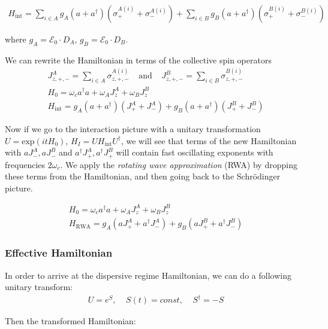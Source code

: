 \documentclass{article}
\numberwithin{equation}{section}
\begin{document}
\begin{gather}
    H_\text{int} = \sum_{i \in A} g_A (a + a^\dagger) (\sigma_{+}^{A(i)} + \sigma_{-}^{A(i)}) + \sum_{i \in B} g_B (a + a^\dagger) (\sigma_{+}^{B(i)} + \sigma_{-}^{B(i)}) 
\end{gather}

where $g_A = \mathcal{E}_0 \cdot D_A$, $g_B = \mathcal{E}_0 \cdot D_B$.

\vspace{1em}
\noindent We can rewrite the Hamiltonian in terms of the collective spin operators 
\begin{gather}
    J_{z,+,-}^A = \sum_{i \in A} \sigma_{z,+,-}^{A(i)}~~~~~ \text{and} ~~~~~ J_{z,+,-}^B = \sum_{i \in B} \sigma_{z,+,-}^{B(i)} \\
    H_0 = \omega_c a^\dagger a + \omega_A J_{z}^A + \omega_B J_{z}^B \\
    H_\text{int} = g_A (a + a^\dagger) (J_{+}^A + J_{-}^A) +  g_B (a + a^\dagger) (J_{+}^B + J_{-}^B)
\end{gather}

\noindent Now if we go to the interaction picture with a unitary transformation $U = \text{exp}(i t H_0)$, $H_I = U H_\text{int} U^\dagger$, we will see that terms of the new Hamiltonian with $a J_{-}^A, a J_{-}^B$ and $a^\dagger J_{+}^A, a^\dagger J_{+}^B$ will contain fast oscillating exponents with frequencies $2 \omega_c$. We apply the \textit{rotating wave approximation} (RWA) by dropping these terms from the Hamiltonian, and then going  back to the Schrödinger picture.

\begin{gather}
    H_0 = \omega_c a^\dagger a + \omega_A J_{z}^A + \omega_B J_{z}^B \\
    H_\text{RWA} = g_A (a J_{+}^A + a^\dagger J_{-}^A) + g_B (a J_{+}^B + a^\dagger J_{-}^B)
\end{gather}

\subsubsection{Effective Hamiltonian}

\noindent In order to arrive at the dispersive regime Hamiltonian, we can do a following unitary transform:
\begin{gather}
    U = e^S,~~~~~ S(t) = const, ~~~~~ S^\dagger = - S
\end{gather}

\noindent Then the transformed Hamiltonian:
\end{document}
